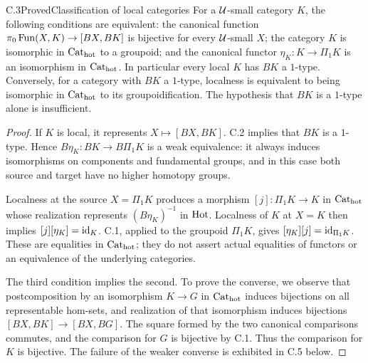 \begin{claim}{C.3}{Proved}{Classification of local categories}
For a $\mathcal U$-small category $K$, the following conditions are equivalent:
the canonical function $\pi_0\operatorname{Fun}(X,K)\to[BX,BK]$ is bijective for
every $\mathcal U$-small $X$; the category $K$ is isomorphic in ${\mathrm{Cat}_{\mathrm{hot}}}$ to a
groupoid; and the canonical functor $\eta_K:K\to\Pi_1K$ is an
isomorphism in ${\mathrm{Cat}_{\mathrm{hot}}}$.  In particular every local $K$ has $BK$ a
$1$-type.  Conversely, for a category with $BK$ a $1$-type, localness
is equivalent to being isomorphic in ${\mathrm{Cat}_{\mathrm{hot}}}$ to its groupoidification.
The hypothesis that $BK$ is a $1$-type alone is insufficient.
\end{claim}
\begin{proof}
If $K$ is local, it represents $X\mapsto[BX,BK]$.  C.2 implies that
$BK$ is a $1$-type.  Hence $B\eta_K:BK\to B\Pi_1K$ is a weak
equivalence: it always induces isomorphisms on components and
fundamental groups, and in this case both source and target have no
higher homotopy groups.

Localness at the source $X=\Pi_1K$ produces a morphism
$[j]:\Pi_1K\to K$ in ${\mathrm{Cat}_{\mathrm{hot}}}$ whose realization represents
$(B\eta_K)^{-1}$ in $\mathrm{Hot}$.  Localness of $K$ at $X=K$ then implies
$[j][\eta_K]=\mathrm{id}_K$.  C.1, applied to the groupoid $\Pi_1K$, gives
$[\eta_K][j]=\mathrm{id}_{\Pi_1K}$.  These are equalities in ${\mathrm{Cat}_{\mathrm{hot}}}$;
they do not assert actual equalities of functors or an equivalence of
the underlying categories.

The third condition implies the second.  To prove the converse, we
observe that postcomposition by an isomorphism $K\to G$ in ${\mathrm{Cat}_{\mathrm{hot}}}$
induces bijections on all representable hom-sets, and realization of
that isomorphism induces bijections $[BX,BK]\to[BX,BG]$.  The square
formed by the two canonical comparisons commutes, and the comparison
for $G$ is bijective by C.1.  Thus the comparison for $K$ is bijective.
The failure of the weaker converse is exhibited in C.5 below.
\end{proof}

